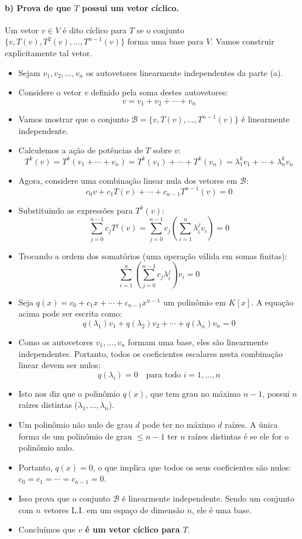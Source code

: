 \paragraph{b) Prova de que $T$ possui um vetor cíclico.}
Um vetor $v \in V$ é dito cíclico para $T$ se o conjunto
$\{v, T(v), T^2(v), \ldots, T^{n-1}(v)\}$ forma uma base para $V$. Vamos construir explicitamente tal vetor.

\begin{itemize}
    \item Sejam $v_1, v_2, \ldots, v_n$ os autovetores linearmente independentes da parte (a).
    \item Considere o vetor $v$ definido pela soma destes autovetores:
    \[
        v = v_1 + v_2 + \cdots + v_n
    \]
    \item Vamos mostrar que o conjunto
    $\mathcal{B} = \{v, T(v), \ldots, T^{n-1}(v)\}$ é linearmente independente.
    \item Calculemos a ação de potências de $T$ sobre $v$:
    \[
        T^k(v) = T^k(v_1 + \cdots + v_n) = T^k(v_1) + \cdots + T^k(v_n) = \lambda_1^k v_1 + \cdots + \lambda_n^k v_n
    \]
    \item Agora, considere uma combinação linear nula dos vetores em $\mathcal{B}$:
    \[
        c_0 v + c_1 T(v) + \cdots + c_{n-1} T^{n-1}(v) = 0
    \]
    \item Substituindo as expressões para $T^k(v)$:
    \[
        \sum_{j=0}^{n-1} c_j T^j(v) =
        \sum_{j=0}^{n-1} c_j \left( \sum_{i=1}^n \lambda_i^j v_i \right) = 0
    \]
    \item Trocando a ordem dos somatórios (uma operação válida em somas finitas):
    \[
        \sum_{i=1}^n \left( \sum_{j=0}^{n-1} c_j \lambda_i^j \right) v_i = 0
    \]
    \item Seja $q(x) = c_0 + c_1 x + \cdots + c_{n-1}x^{n-1}$ um polinômio em $K[x]$. A equação acima pode ser
    escrita como:
    \[
        q(\lambda_1)v_1 + q(\lambda_2)v_2 + \cdots + q(\lambda_n)v_n = 0
    \]
    \item Como os autovetores $v_1, \ldots, v_n$ formam uma base, eles são linearmente independentes.
    Portanto, todos os coeficientes escalares nesta combinação linear devem ser nulos:
    \[
        q(\lambda_i) = 0 \quad \text{para todo } i = 1, \ldots, n
    \]
    \item Isto nos diz que o polinômio $q(x)$, que tem grau no máximo $n-1$, possui $n$ raízes distintas
    ($\lambda_1, \ldots, \lambda_n$).
    \item Um polinômio não nulo de grau $d$ pode ter no máximo $d$ raízes. A única forma de um polinômio
    de grau $\leq n-1$ ter $n$ raízes distintas é se ele for o polinômio nulo.
    \item Portanto, $q(x) = 0$, o que implica que todos os seus coeficientes são nulos:
    $c_0 = c_1 = \cdots = c_{n-1} = 0$.
    \item Isso prova que o conjunto $\mathcal{B}$ é linearmente independente. Sendo um conjunto com $n$
    vetores L.I. em um espaço de dimensão $n$, ele é uma base.
    \item Concluímos que \textbf{$v$ é um vetor cíclico para $T$}.
\end{itemize}

